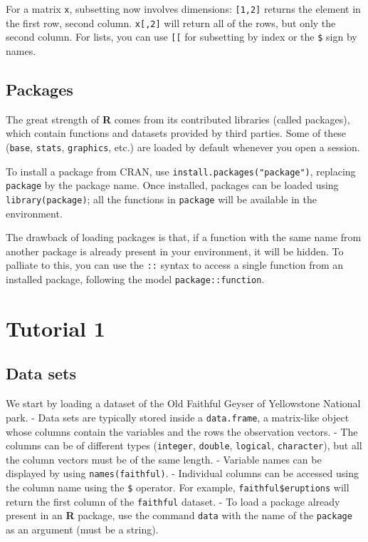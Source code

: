 \documentclass[]{book}
\let\BeginKnitrBlock\begin \let\EndKnitrBlock\end
\begin{document}
For a matrix \texttt{x}, subsetting now involves dimensions:
\texttt{{[}1,2{]}} returns the element in the first row, second column.
\texttt{x{[},2{]}} will return all of the rows, but only the second
column. For lists, you can use \texttt{{[}{[}} for subsetting by index
or the \texttt{\$} sign by names.

\subsection{Packages}\label{packages}

The great strength of \textbf{R} comes from its contributed libraries
(called packages), which contain functions and datasets provided by
third parties. Some of these (\texttt{base}, \texttt{stats},
\texttt{graphics}, etc.) are loaded by default whenever you open a
session.

To install a package from CRAN, use
\texttt{install.packages("package")}, replacing \texttt{package} by the
package name. Once installed, packages can be loaded using
\texttt{library(package)}; all the functions in \texttt{package} will be
available in the environment.

\BeginKnitrBlock{rmdcaution}
The drawback of loading packages is that, if a function with the same
name from another package is already present in your environment, it
will be hidden. To palliate to this, you can use the \texttt{::} syntax
to access a single function from an installed package, following the
model \texttt{package::function}.
\EndKnitrBlock{rmdcaution}

\section{Tutorial 1}\label{week1}

\subsection{Data sets}\label{data-sets}

We start by loading a dataset of the Old Faithful Geyser of Yellowstone
National park. - Data sets are typically stored inside a
\texttt{data.frame}, a matrix-like object whose columns contain the
variables and the rows the observation vectors. - The columns can be of
different types (\texttt{integer}, \texttt{double}, \texttt{logical},
\texttt{character}), but all the column vectors must be of the same
length. - Variable names can be displayed by using
\texttt{names(faithful)}. - Individual columns can be accessed using the
column name using the \texttt{\$} operator. For example,
\texttt{faithful\$eruptions} will return the first column of the
\texttt{faithful} dataset. - To load a package already present in an
\textbf{R} package, use the command \texttt{data} with the name of the
\texttt{package} as an argument (must be a string).
\end{document}
